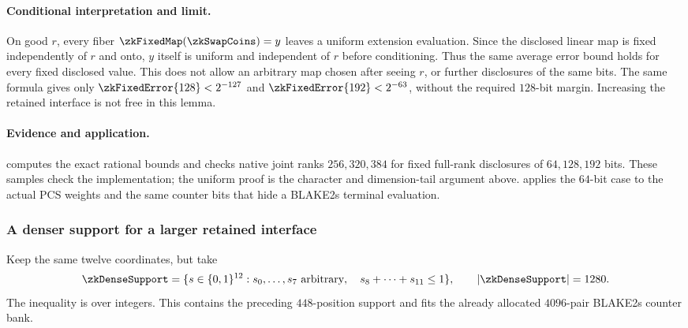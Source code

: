\paragraph{Conditional interpretation and limit.} On good $r$, every fiber $\zkFixedMap(\zkSwapCoins)=y$ leaves a uniform extension evaluation. Since the disclosed linear map is fixed independently of $r$ and onto, $y$ itself is uniform and independent of $r$ before conditioning. Thus the same average error bound holds for every fixed disclosed value. This does not allow an arbitrary map chosen after seeing $r$, or further disclosures of the same bits. The same formula gives only $\zkFixedError{128}<2^{-127}$ and $\zkFixedError{192}<2^{-63}$, without the required $128$-bit margin. Increasing the retained interface is not free in this lemma.

\paragraph{Evidence and application.}  computes the exact rational bounds and checks native joint ranks $256,320,384$ for fixed full-rank disclosures of $64,128,192$ bits. These samples check the implementation; the uniform proof is the character and dimension-tail argument above.  applies the $64$-bit case to the actual PCS weights and the same counter bits that hide a BLAKE2s terminal evaluation.

\subsubsection{A denser support for a larger retained interface}

Keep the same twelve coordinates, but take
\[
 \zkDenseSupport=\{s\in\cube{12}:s_0,\ldots,s_7\text{ arbitrary},\quad s_8+\cdots+s_{11}\le1\},
 \qquad |\zkDenseSupport|=1280.
\]
The inequality is over integers. This contains the preceding $448$-position support and fits the already allocated $4096$-pair BLAKE2s counter bank.

